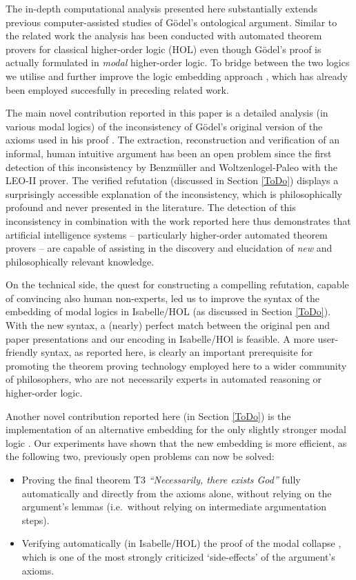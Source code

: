 \documentclass{article}
\begin{document}
The in-depth computational analysis presented here substantially
extends previous computer-assisted studies of G\"odel's ontological
argument. Similar to the related work \cite{J30,C40} the analysis has
been conducted with automated theorem provers for classical
higher-order logic (HOL) even though G\"odel's proof is actually
formulated in \emph{modal} higher-order logic. To bridge between the two
logics we utilise and further improve the logic embedding
approach \cite{J23,C40}, which has already been employed succesfully in preceding related work.


The main novel contribution reported in this paper is a detailed analysis (in various modal logics) 
of the inconsistency of G\"{o}del's original version of the axioms used in his proof 
. The extraction, reconstruction and verification of an informal, 
human intuitive argument has been an open problem since the first detection of this inconsistency 
by Benzm\"uller and Woltzenlogel-Paleo  with the LEO-II prover. 
The verified refutation (discussed in Section \ref{ToDo}) displays a surprisingly accessible
explanation of the inconsistency, which is philosophically
profound and never presented in the
literature. The detection of this inconsistency in combination with
the work reported here thus demonstrates that artificial intelligence systems 
-- particularly higher-order automated theorem provers -- 
are capable of assisting in the discovery and elucidation of
\emph{new} and philosophically relevant knowledge. 

On the technical side, the quest for constructing a compelling refutation, 
capable of convincing also human non-experts, led us to improve the 
syntax of the embedding of modal logics in
Isabelle/HOL (as discussed in Section  \ref{ToDo}). With the new
syntax, a (nearly) perfect match
between the original pen and paper presentations and our encoding in
Isabelle/HOl is feasible. A more user-friendly syntax, as reported here, is clearly an important prerequisite
for promoting the theorem proving technology employed here to a wider community of
philosophers, who are not necessarily experts in automated reasoning or higher-order logic.

Another novel contribution reported here (in Section \ref{ToDo}) is
the implementation of an alternative embedding for the only slightly
stronger modal logic \SFiveU. Our experiments have shown that the new
embedding is more efficient, as the following two, previously open problems can now be solved:
\begin{itemize}
\item Proving the final theorem T3 \textit{``Necessarily, there
    exists God''} fully automatically and directly from the axioms
  alone, without relying on the argument's lemmas (i.e.~without
  relying on intermediate argumentation steps).
\item Verifying automatically (in Isabelle/HOL) the proof of the modal
  collapse \cite{Sobel}, which is one of the most strongly criticized
  `side-effects' of the argument's axioms.
\end{itemize}
\end{document}
